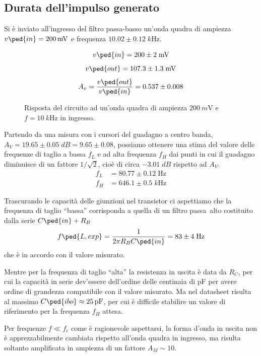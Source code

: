 \documentclass[10pt,a4paper]{article}
\begin{document}
\subsection{Durata dell'impulso generato}
Si è inviato all'ingresso del filtro passa-basso un'onda quadra di
ampiezza $v\ped{in} = \SI{200}{m\V}$ e frequenza $10.02 \pm 0.12 \; \si{k\Hz}$.

$$v\ped{in} = 200 \pm 2 \; \si{m\V}$$
$$v\ped{out} = 107.3 \pm 1.3 \; \si{m\V}$$
$$A_v = \frac{v\ped{out}}{v\ped{in}} = 0.537 \pm 0.008$$

\begin{figure}[htbp]
\centering
\caption{Risposta del circuito ad un'onda quadra di ampiezza
$\SI{200}{m\V}$ e $f = \SI{10}{k\Hz}$ in ingresso. \label{fig: intsqw}}
\end{figure}

Partendo da una misura con i cursori del guadagno a centro banda,
$A_V = 19.65 \pm 0.05 \; \si{dB} = 9.65 \pm 0.08$, possiamo ottenere una stima 
del valore
delle frequenze di taglio a bassa $f_L$ e ad alta frequenza $f_H$ dai punti
in cui il guadagno diminuisce di un fattore $1/\sqrt{2}$, cioè di circa
$-3.01 \; \si{dB}$ rispetto ad $A_V$.
\begin{align*}
f_L &= 80.77 \pm 0.12 \; \si{\Hz}\\
f_H &= 646.1 \pm 0.5 \; \si{k\Hz}
\end{align*}

Trascurando le capacità delle giunzioni nel transistor ci aspettiamo che
la frequenza di taglio ``bassa'' corrisponda a quella di un filtro passa~alto
costituito dalla serie $C\ped{in} + R_B$
\begin{equation}
f\ped{L, exp} = \frac{1}{2\pi R_B C\ped{in}} = 83 \pm 4 \; \si{\Hz}
\end{equation} 
che è in accordo con il valore misurato.

Mentre per la frequenza di taglio ``alta'' la resistenza in uscita è data
da $R_C$, per cui la capacità in serie dev'essere dell'ordine delle centinaia
di pF per avere ordine di grandezza compatibile con il valore misurato.
Ma nel datasheet risulta al massimo $C\ped{ibo} \approx \SI{25}{p\F}$, per cui
è difficile stabilire un valore di riferimento per la frequenza $f_H$ attesa.

Per frequenze $f \ll f_c$ come è ragionevole aspettarsi, la forma d'onda in
uscita non è apprezzabilmente cambiata rispetto all'onda quadra in ingresso,
ma risulta soltanto amplificata in ampiezza di un fattore $A_M \sim 10$.
\end{document}
